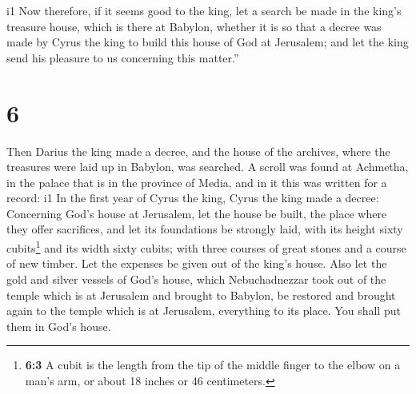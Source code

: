 i1 Now therefore, if it seems good to the king, let a
search be made in the king's treasure house, which is there at Babylon,
whether it is so that a decree was made by Cyrus the king to build this
house of God at Jerusalem; and let the king send his pleasure to us
concerning this matter.''

\hypertarget{section-5}{%
\section{6}\label{section-5}}

 Then Darius the king made a decree, and the house of the
archives, where the treasures were laid up in Babylon, was searched.
 A scroll was found at Achmetha, in the palace that is in
the province of Media, and in it this was written for a record:
i1 In the first year of Cyrus the king, Cyrus the king
made a decree: Concerning God's house at Jerusalem, let the house be
built, the place where they offer sacrifices, and let its foundations be
strongly laid, with its height sixty cubits\footnote{\textbf{6:3} A
  cubit is the length from the tip of the middle finger to the elbow on
  a man's arm, or about 18 inches or 46 centimeters.} and its width
sixty cubits;  with three courses of great stones and a
course of new timber. Let the expenses be given out of the king's house.
 Also let the gold and silver vessels of God's house,
which Nebuchadnezzar took out of the temple which is at Jerusalem and
brought to Babylon, be restored and brought again to the temple which is
at Jerusalem, everything to its place. You shall put them in God's
house.

